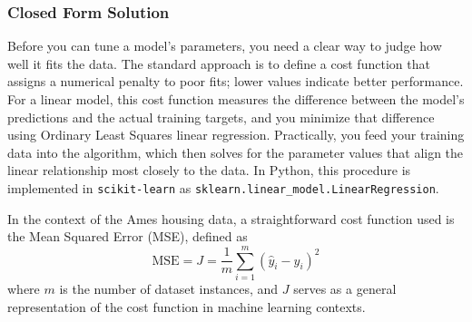 \documentclass[12pt,letter]{article}
\begin{document}
	\vspace{-2ex}
\subsubsection{Closed Form Solution}
	\vspace{-1ex}

Before you can tune a model's parameters, you need a clear way to judge how well it fits the data. The standard approach is to define a cost function that assigns a numerical penalty to poor fits; lower values indicate better performance. For a linear model, this cost function measures the difference between the model's predictions and the actual training targets, and you minimize that difference using Ordinary Least Squares linear regression. Practically, you feed your training data into the algorithm, which then solves for the parameter values that align the linear relationship most closely to the data. In Python, this procedure is implemented in \texttt{scikit-learn} as \texttt{sklearn.linear\_model.LinearRegression}.

%

In the context of the Ames housing data, a straightforward cost function used is the Mean Squared Error (MSE), defined as
\begin{equation}
\text{MSE} = J = \frac{1}{m} \sum_{i=1}^{m} (\hat{y}_i-y_i)^2
\end{equation}
\noindent where $m$ is the number of dataset instances, and $J$ serves as a general representation of the cost function in machine learning contexts.
\end{document}
